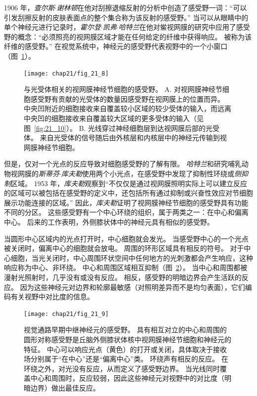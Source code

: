 1906 年，\textit{查尔斯$\cdot$谢林顿}在他对刮擦退缩反射的分析中创造了感受野一词：“可以引发刮擦反射的皮肤表面点的整个集合称为该反射的感受野。” 
当可以从眼睛中的单个神经元进行记录时，\textit{霍尔登$\cdot$凯弗$\cdot$哈特兰}在他对鲎视网膜的研究中应用了感受野的概念：“必须照亮的视网膜区域才能在任何给定的纤维中获得响应。
被称为该纤维的感受野。” 
在视觉系统中，神经元的感受野代表视野中的一个小窗口（图~\ref{fig:21_8}）。


\begin{figure}[htbp]
	\centering
	\texttt{[image: chap21/fig\_21\_8]}
	\caption{与光受体相关的视网膜神经节细胞的感受野。
		A. 对视网膜神经节细胞感受野有贡献的光受体的数量因感受野在视网膜上的位置而异。
		中央凹附近的细胞接收来自覆盖较小区域的较少受体的输入，而远离中央凹的细胞接收来自覆盖较大区域的更多受体的输入（见图~\ref{fig:21_10}）。
		B. 光线穿过神经细胞层到达视网膜后部的光受体。
		来自光受体的信号随后由外核层和内核层中的神经元传输到视网膜神经节细胞。}
	\label{fig:21_8}
\end{figure}


但是，仅对一个光点的反应导致对细胞感受野的了解有限。
\textit{哈特兰}和研究哺乳动物视网膜的\textit{斯蒂芬$\cdot$库夫勒}使用两个小光点，在感受野中发现了抑制性环绕或\textit{侧抑制}区域。
1953 年，\textit{库夫勒}观察到“不仅仅是通过视网膜照明实际上可以建立反应的区域可以被包括在感受野的定义中，还包括所有通过抑制或兴奋性效应对节细胞展示功能连接的区域。” 
因此，\textit{库夫勒}证明了视网膜神经节细胞的感受野具有功能不同的分区。
这些感受野有一个中心环绕的组织，属于两类之一：在中心和偏离中心。
后来的工作表明，外侧膝状体中的神经元具有相似的感受野。


当圆形中心区域内的光点打开时，中心细胞就会发光。
当感受野中心的一个光点被关闭时，偏离中心的细胞就会放电。
周围的环形区域具有相反的符号。 
对于中心细胞，当光关闭时，中心周围环状空间中任何地方的光刺激都会产生响应，这种响应称为中心、非环绕。 
中心和周围区域相互抑制（图~\ref{fig:21_9}）。
当中心和周围都被漫射光照射时，几乎没有或没有反应。 
相反，感受野的明暗边界会产生活跃的反应。
因为这些神经元对边界和轮廓最敏感（对照明差异而不是均匀表面），它们编码有关视野中对比度的信息。


\begin{figure}[htbp]
	\centering
	\texttt{[image: chap21/fig\_21\_9]}
	\caption{视觉通路早期中继神经元的感受野。
		具有相互对立的中心和周围的圆形对称感受野是丘脑外侧膝状体核中视网膜神经节细胞和神经元的特征。
		中心可以响应光点（黄色）的打开或关闭，具体取决于接收场分别属于“在中心”还是“偏离中心”类。
		环绕声有相反的反应。
		在环绕之外，对光没有反应，从而定义了感受野边界。
		当光线同时覆盖中心和周围时，反应较弱，因此这些神经元对视野中的对比度（明暗边界）做出最佳反应。}
	\label{fig:21_9}
\end{figure}


